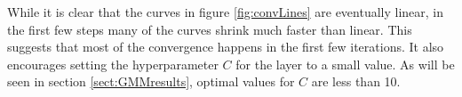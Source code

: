 While it is clear that the curves in figure \ref{fig:convLines} are eventually linear, in the first few steps many of the curves shrink much faster than linear. This suggests that most of the convergence happens in the first few iterations. It also encourages setting the hyperparameter \( C \) for the \RS layer to a small value. As will be seen in section \ref{sect:GMMresults}, optimal values for \( C \) are less than 10.

%



